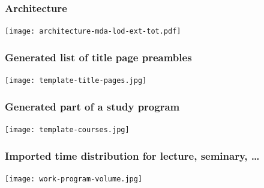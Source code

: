 \documentclass[10pt]{beamer}
\begin{document}
\begin{frame}
  \frametitle{Architecture}
  \begin{adjustwidth}{-2.5em}{-2.5em}
    \begin{center}
      \texttt{[image: architecture-mda-lod-ext-tot.pdf]}
    \end{center}
  \end{adjustwidth}

\end{frame}

\begin{frame}
  \frametitle{Generated list of title page preambles}
    \begin{adjustwidth}{-2.5em}{-2.5em}
    \begin{center}
      \texttt{[image: template-title-pages.jpg]}
    \end{center}
  \end{adjustwidth}
\end{frame}

\begin{frame}
  \frametitle{Generated part of a study program}
   \begin{adjustwidth}{-2.5em}{-2.5em}
    \begin{center}
      \texttt{[image: template-courses.jpg]}
    \end{center}
  \end{adjustwidth}
\end{frame}

\begin{frame}
  \frametitle{Imported time distribution for lecture, seminary, \ldots}
   \begin{adjustwidth}{-2.5em}{-2.5em}
    \begin{center}
      \texttt{[image: work-program-volume.jpg]}
    \end{center}
  \end{adjustwidth}
\end{frame}
\end{document}
